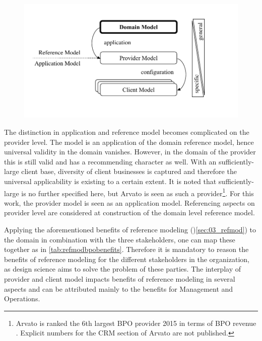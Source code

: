\begin{figure}[caption={Model levels}, label={fig:modellevels}]
	{	\includegraphics[width=.8\textwidth]{figures/refmodlevels.pdf}}
\end{figure}

The distinction in application and reference model becomes complicated on the provider level. The model is an application of the domain reference model, hence universal validity in the domain vanishes. However, in the domain of the provider this is still valid and has a recommending character as well. With an sufficiently-large client base, diversity of client businesses is captured and therefore the universal applicability is existing to a certain extent. It is noted that sufficiently-large is no further specified here, but Arvato is seen as such a provider\footnote{Arvato is ranked the 6th largest BPO provider 2015 in terms of BPO revenue \citep{hfs2016top}. Explicit numbers for the CRM section of Arvato are not published.}. For this work, the provider model is seen as an application model. Referencing aspects on provider level are considered at construction of the domain level reference model.  

Applying the aforementioned benefits of reference modeling (\cf )\ref{sec:03_refmod}) to the domain in combination with the three stakeholders, one can map these together as in \Tab \ref{tab:refmodbpobenefits}. Therefore it is mandatory to reason the benefits of reference modeling for the different stakeholders in the organization, as design science aims to solve the problem of these parties. The interplay of provider and client model impacts benefits of reference modeling in several aspects and can be attributed mainly to the benefits for Management and Operations.


